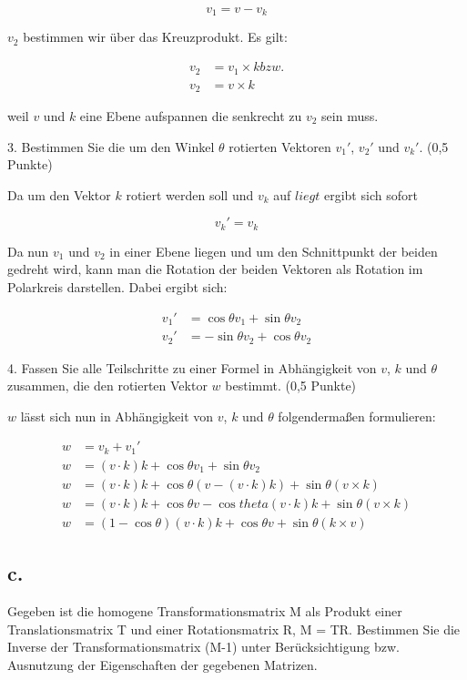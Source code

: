 \documentclass[12pt]{scrreprt}
\begin{document}
\[
v_1 = v - v_k
\]

$v_2$ bestimmen wir über das Kreuzprodukt. Es gilt:

\begin{align*}
	v_2 &= v_1 \times k bzw.\\
	v_2 &= v \times k
\end{align*}

weil $v$ und $k$ eine Ebene aufspannen die senkrecht zu $v_2$ sein muss.

3. Bestimmen Sie die um den Winkel $\theta$ rotierten Vektoren $v_1'$, $v_2'$ und $v_k'$. (0,5 Punkte)

Da um den Vektor $k$ rotiert werden soll und $v_k$ auf $liegt$ ergibt sich sofort

\[
	v_k' = v_k
\]

Da nun $v_1$ und $v_2$ in einer Ebene liegen und um den Schnittpunkt der beiden gedreht wird, kann man die Rotation der beiden Vektoren als Rotation im Polarkreis darstellen. Dabei ergibt sich:

\begin{align*}
	v_1' &= \cos{\theta} v_1 + \sin{\theta} v_2\\
	v_2' &= -\sin{\theta} v_2 + \cos{\theta} v_2
\end{align*}

4. Fassen Sie alle Teilschritte zu einer Formel in Abhängigkeit von $v$, $k$ und $\theta$ zusammen, die den
rotierten Vektor $w$ bestimmt. (0,5 Punkte)

$w$ lässt sich nun in Abhängigkeit von $v$, $k$ und $\theta$ folgendermaßen formulieren:

\begin{align*}
	w &= v_k + v_1'\\
	w &= (v \cdot k)k + \cos{\theta} v_1 + \sin{\theta} v_2\\
	w &= (v \cdot k)k + \cos{\theta} (v - (v \cdot k)k) + \sin{\theta} (v \times k)\\
	w &= (v \cdot k)k + \cos{\theta}v - \cos{theta}(v \cdot k)k + \sin{\theta}(v \times k)\\
	w &= (1 - \cos{\theta})(v \cdot k)k + \cos{\theta}v + \sin{\theta}(k \times v)
\end{align*}

\subsection*{c.}

Gegeben ist die homogene Transformationsmatrix M als Produkt einer Translationsmatrix T und einer
Rotationsmatrix R, M = TR. Bestimmen Sie die Inverse der Transformationsmatrix (M-1) unter
Berücksichtigung bzw. Ausnutzung der Eigenschaften der gegebenen Matrizen.
\end{document}
